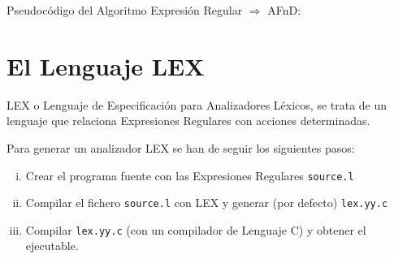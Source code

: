 \prog Pseudocódigo del Algoritmo Expresión Regular $\Rightarrow$ AFnD:








\section{El Lenguaje LEX}

LEX o Lenguaje de Especificación para Analizadores Léxicos, se trata de un lenguaje que relaciona Expresiones Regulares con acciones determinadas.

Para generar un analizador LEX se han de seguir los siguientes pasos:

\begin{enumerate}[i.]

\item Crear el programa fuente con las Expresiones Regulares \texttt{source.l}

\item Compilar el fichero \texttt{source.l} con LEX y generar (por defecto) \texttt{lex.yy.c}

\item Compilar \texttt{lex.yy.c} (con un compilador de Lenguaje C) y obtener el ejecutable.

\end{enumerate}

